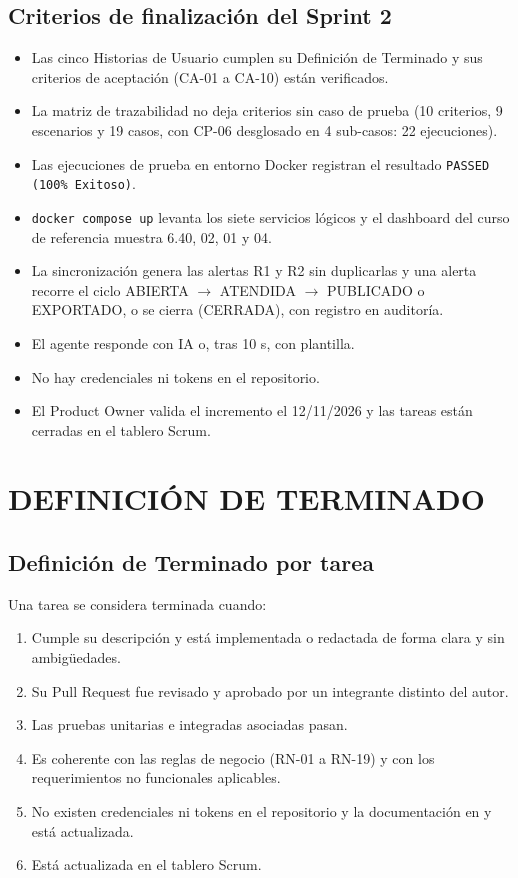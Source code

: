 \documentclass[11pt,a4paper]{article}
\begin{document}
\subsection{Criterios de finalización del Sprint 2}
\begin{itemize}
  \item Las cinco Historias de Usuario cumplen su Definición de Terminado y sus criterios de aceptación (CA-01 a CA-10) están verificados.
  \item La matriz de trazabilidad no deja criterios sin caso de prueba (10 criterios, 9 escenarios y 19 casos, con CP-06 desglosado en 4 sub-casos: 22 ejecuciones).
  \item Las ejecuciones de prueba en entorno Docker registran el resultado \texttt{PASSED (100\% Exitoso)}.
  \item \texttt{docker compose up} levanta los siete servicios lógicos y el dashboard del curso de referencia muestra 6.40, 02, 01 y 04.
  \item La sincronización genera las alertas R1 y R2 sin duplicarlas y una alerta recorre el ciclo ABIERTA $\rightarrow$ ATENDIDA $\rightarrow$ PUBLICADO o EXPORTADO, o se cierra (CERRADA), con registro en auditoría.
  \item El agente responde con IA o, tras 10 s, con plantilla.
  \item No hay credenciales ni tokens en el repositorio.
  \item El Product Owner valida el incremento el 12/11/2026 y las tareas están cerradas en el tablero Scrum.
\end{itemize}

\section{DEFINICIÓN DE TERMINADO}

\subsection{Definición de Terminado por tarea}
Una tarea se considera terminada cuando:
\begin{enumerate}
  \item Cumple su descripción y está implementada o redactada de forma clara y sin ambigüedades.
  \item Su Pull Request fue revisado y aprobado por un integrante distinto del autor.
  \item Las pruebas unitarias e integradas asociadas pasan.
  \item Es coherente con las reglas de negocio (RN-01 a RN-19) y con los requerimientos no funcionales aplicables.
  \item No existen credenciales ni tokens en el repositorio y la documentación en  y  está actualizada.
  \item Está actualizada en el tablero Scrum.
\end{enumerate}
\end{document}
